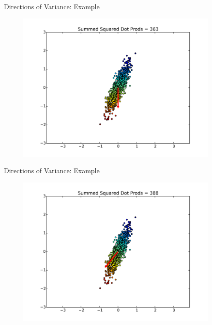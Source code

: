 \documentclass{beamer}
\begin{document}
\begin{frame}{Directions of Variance: Example}

\begin{figure}[t]
    \centering
	\includegraphics[width=0.9\textwidth]{2DPCADir2.pdf}
\end{figure}

\end{frame}


\begin{frame}{Directions of Variance: Example}

\begin{figure}[t]
    \centering
	\includegraphics[width=0.9\textwidth]{2DPCADir3.pdf}
\end{figure}

\end{frame}
\end{document}
